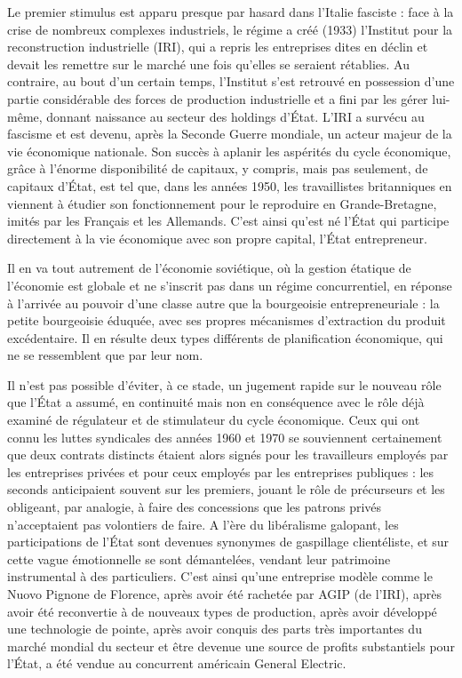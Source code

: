 Le premier stimulus est apparu presque par hasard dans l'Italie fasciste : face à la crise de nombreux complexes industriels, le régime a créé (1933) l'Institut pour la reconstruction industrielle (IRI), qui a repris les entreprises dites en déclin et devait les remettre sur le marché une fois qu'elles se seraient rétablies. Au contraire, au bout d'un certain temps, l'Institut s'est retrouvé en possession d'une partie considérable des forces de production industrielle et a fini par les gérer lui-même, donnant naissance au secteur des holdings d'État. L'IRI a survécu au fascisme et est devenu, après la Seconde Guerre mondiale, un acteur majeur de la vie économique nationale. Son succès à aplanir les aspérités du cycle économique, grâce à l'énorme disponibilité de capitaux, y compris, mais pas seulement, de capitaux d'État, est tel que, dans les années 1950, les travaillistes britanniques en viennent à étudier son fonctionnement pour le reproduire en Grande-Bretagne, imités par les Français et les Allemands. C'est ainsi qu'est né l'État qui participe directement à la vie économique avec son propre capital, l'État entrepreneur.

Il en va tout autrement de l'économie soviétique, où la gestion étatique de l'économie est globale et ne s'inscrit pas dans un régime concurrentiel, en réponse à l'arrivée au pouvoir d'une classe autre que la bourgeoisie entrepreneuriale : la petite bourgeoisie éduquée, avec ses propres mécanismes d'extraction du produit excédentaire. Il en résulte deux types différents de planification économique, qui ne se ressemblent que par leur nom.

Il n'est pas possible d'éviter, à ce stade, un jugement rapide sur le nouveau rôle que l'État a assumé, en continuité mais non en conséquence avec le rôle déjà examiné de régulateur et de stimulateur du cycle économique. Ceux qui ont connu les luttes syndicales des années 1960 et 1970 se souviennent certainement que deux contrats distincts étaient alors signés pour les travailleurs employés par les entreprises privées et pour ceux employés par les entreprises publiques : les seconds anticipaient souvent sur les premiers, jouant le rôle de précurseurs et les obligeant, par analogie, à faire des concessions que les patrons privés n'acceptaient pas volontiers de faire. A l'ère du libéralisme galopant, les participations de l'État sont devenues synonymes de gaspillage clientéliste, et sur cette vague émotionnelle se sont démantelées, vendant leur patrimoine instrumental à des particuliers. C'est ainsi qu'une entreprise modèle comme le Nuovo Pignone de Florence, après avoir été rachetée par AGIP (de l'IRI), après avoir été reconvertie à de nouveaux types de production, après avoir développé une technologie de pointe, après avoir conquis des parts très importantes du marché mondial du secteur et être devenue une source de profits substantiels pour l'État, a été vendue au concurrent américain General Electric.

